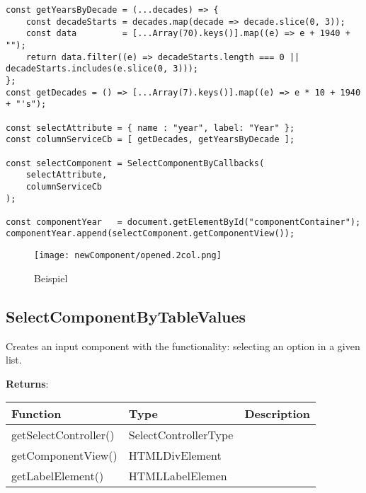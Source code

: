 \begin{lstlisting}[style = htmlcssjs, label = api:selectComponentCbExample]
const getYearsByDecade = (...decades) => {
    const decadeStarts = decades.map(decade => decade.slice(0, 3));
    const data         = [...Array(70).keys()].map((e) => e + 1940 + "");
    return data.filter((e) => decadeStarts.length === 0 || decadeStarts.includes(e.slice(0, 3)));
};
const getDecades = () => [...Array(7).keys()].map((e) => e * 10 + 1940 + "'s");

const selectAttribute = { name : "year", label: "Year" };
const columnServiceCb = [ getDecades, getYearsByDecade ];

const selectComponent = SelectComponentByCallbacks(
    selectAttribute,
    columnServiceCb
);

const componentYear   = document.getElementById("componentContainer");
componentYear.append(selectComponent.getComponentView());
\end{lstlisting}
    
\begin{figure}[!htb]
    \centering
    \texttt{[image: newComponent/opened.2col.png]}
    \caption*{\centering Beispiel }
    \label{api:selectComponentCbImg}
\end{figure}


\clearpage
\subsection*{SelectComponentByTableValues}

\vspace*{6pt}
Creates an input component with the functionality: selecting an option in a given list. 

\vspace*{18pt}
\noindent
\textbf{Returns}: 

\begin{table}[!htb] 
    \label{api:selectComponentByTableValuesReturn}
    \footnotesize
    \setlength\extrarowheight{4pt}
    \begin{tabular}{ p{3.5cm} p{3.5cm} p{6cm} }
        \toprule[1.2pt]
        \textbf{Function}     & \textbf{Type}        & \textbf{Description} \\
        \midrule
        getSelectController() & SelectControllerType &  \\
        getComponentView()    & HTMLDivElement       &  \\
        getLabelElement()     & HTMLLabelElemen      &  \\
        \bottomrule[1.2pt]
    \end{tabular}
\end{table}

